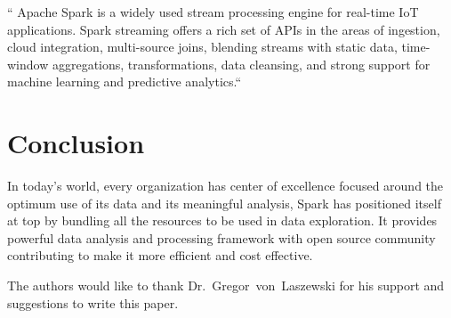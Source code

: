 `` Apache Spark is a widely used stream processing engine for real-time IoT applications. Spark streaming
offers a rich set of APIs in the areas of ingestion, cloud integration, multi-source joins, blending streams
with static data, time-window aggregations, transformations, data cleansing, and strong support for machine
learning and predictive analytics.``~\cite{hid-sp18-522-deepcore}


\section{Conclusion}

In today's world, every organization has center of excellence focused around the optimum use of its data and
its meaningful analysis, Spark has positioned itself at top by bundling all the resources to be used in data
exploration. It provides powerful data analysis and processing framework with open source community 
contributing to make it more efficient and cost effective. 


\begin{acks}

  The authors would like to thank Dr.~Gregor~von~Laszewski for his
  support and suggestions to write this paper.

\end{acks}



